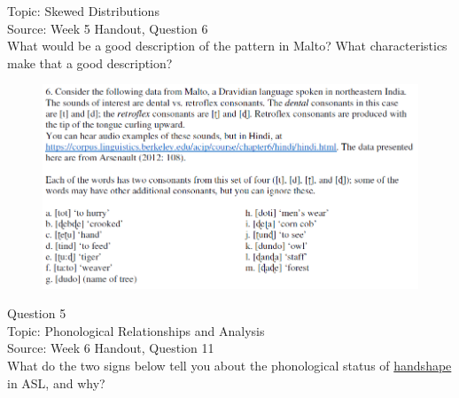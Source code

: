 \documentclass[12pt]{article}
\begin{document}
Topic: Skewed Distributions\\
Source: Week 5 Handout, Question 6\\

What would be a good description of the pattern in Malto? What characteristics make that a good description?\\

\begin{figure}[H]
\includegraphics{../images/malto.png}
\end{figure}

\newpage

{\large Question 5}\\

Topic: Phonological Relationships and Analysis\\
Source: Week 6 Handout, Question 11\\

What do the two signs below tell you about the phonological status of \underline{handshape} in ASL, and why?\\
\end{document}
